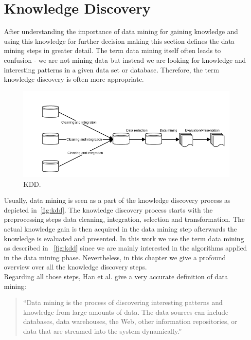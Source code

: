 \section{Knowledge Discovery}

After understanding the importance of data mining for gaining knowledge and using this knowledge for further decision making this section defines the data mining steps in greater detail. The term data mining itself often leads to confusion - we are not mining data but instead we are looking for knowledge and interesting patterns in a given data set or database. Therefore, the term knowledge discovery is often more appropriate.


\begin{figure}[htsb]
  \centering
  \includegraphics[scale=0.5]{figures/kdd}
  \caption[kdd]{KDD.}\label{fig:kdd}
\end{figure}

Usually, data mining is seen as a part of the knowledge discovery process as depicted in~\autoref{fig:kdd}. The knowledge discovery process starts with the preprocessing steps data cleaning, integration, selection and transformation. The actual knowledge gain is then acquired in the data mining step afterwards the knowledge is evaluated and presented. In this work we use the term data mining as described in ~\autoref{fig:kdd} since we are mainly interested in the algorithms applied in the data mining phase. Nevertheless, in this chapter we give a profound overview over all the knowledge discovery steps.
\\
Regarding all those steps, Han et al. give a very accurate definition of data mining: 
\begin{quote}
“Data mining is the process of discovering interesting patterns and knowledge from large amounts of data. The data sources can include databases, data warehouses, the Web, other information repositories, or data that are streamed into the system dynamically.”
\end{quote}
 

